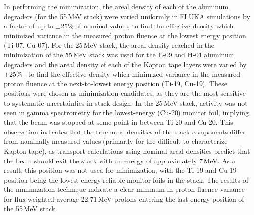 In performing the  minimization, the areal density of each of the  aluminum degraders (for the 55\,MeV stack)  were varied uniformly in FLUKA simulations  by a factor of up to $\pm$25\% of nominal values, to find the effective density which minimized variance in the measured proton fluence at the lowest energy position (Ti-07, Cu-07).
For the 25\,MeV stack, the areal density reached in the minimization of the 55\,MeV stack was used for  the E-09 and H-01 aluminum degraders
and the areal density of each of the  Kapton tape  layers  were 
varied 
by 
$\pm$25\%
, to find the effective density which minimized variance in the measured proton fluence at the next-to-lowest energy position (Ti-19, Cu-19).
These 
positions were chosen as  minimization candidates, as they are the most sensitive to systematic uncertainties in stack design.
In the 25\,MeV stack, activity was not seen in gamma spectrometry for the lowest-energy (Cu-20) monitor foil, implying that the beam was stopped at some point in between Ti-20 and Cu-20.
This observation 
indicates that  the true areal densities of the stack components differ from nominally measured values (primarily for the difficult-to-characterize Kapton tape), as transport calculations using nominal areal densities predict that the beam should exit the stack 
with an energy of approximately 7\,MeV.
As a result, this position was not used for minimization, with the Ti-19 and Cu-19 position being the lowest-energy reliable monitor foils in the stack.
% 
% 
% 
The results of the minimization technique indicate a clear minimum in proton fluence variance for flux-weighted average 22.71\,MeV protons entering the last energy position of the 55\,MeV stack.
